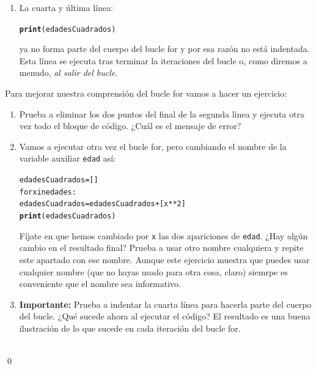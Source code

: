 \documentclass[10pt,a4paper]{article}\usepackage[]{graphicx}\usepackage[]{color}
\makeatletter
\newcommand{\hlstd}[1]{\textcolor[rgb]{0.345,0.345,0.345}{#1}}%
\newcommand{\hlkwd}[1]{\textcolor[rgb]{0.737,0.353,0.396}{\textbf{#1}}}%
\newenvironment{kframe}{%
 \def\at@end@of@kframe{}%
 \ifinner\ifhmode%
  \def\at@end@of@kframe{\end{minipage}}%
  \begin{minipage}{\columnwidth}%
 \fi\fi%
 \def\FrameCommand##1{\hskip\@totalleftmargin \hskip-\fboxsep
 \colorbox{shadecolor}{##1}\hskip-\fboxsep
     \hskip-\linewidth \hskip-\@totalleftmargin \hskip\columnwidth}%
 \MakeFramed {\advance\hsize-\width
   \@totalleftmargin\z@ \linewidth\hsize
   \@setminipage}}%
 {\par\unskip\endMakeFramed%
 \at@end@of@kframe}
\newenvironment{knitrout}{}{} %
\makeatother
\begin{document}
\begin{enumerate}
\item La cuarta y última línea:
\begin{knitrout}
\color{fgcolor}\begin{kframe}
\begin{alltt}
\hlkwd{print}\hlstd{(edadesCuadrados)}
\end{alltt}
\end{kframe}
\end{knitrout}
ya no forma parte del cuerpo del bucle for y por esa razón no está indentada. Esta línea se ejecuta tras terminar la iteraciones del bucle o, como diremos a menudo, {\em al salir del bucle}.

\end{enumerate}

Para mejorar nuestra comprensión del bucle for vamos a hacer un ejercicio:

\begin{ejercicio}
\label{tut02:ejercicio15}
\quad
\begin{enumerate}
\item Prueba a eliminar los dos puntos del final de la segunda línea y ejecuta otra vez todo el bloque de código. ¿Cuál es el mensaje de error?

\item Vamos a ejecutar otra vez el bucle for, pero cambiando el nombre de la variable auxiliar {\tt edad} así:
\begin{knitrout}
\color{fgcolor}\begin{kframe}
\begin{alltt}
edadesCuadrados = []
for x in edades:
  edadesCuadrados = edadesCuadrados + [x**2]
\hlkwd{print}(edadesCuadrados)
\end{alltt}
\end{kframe}
\end{knitrout}
Fíjate en que hemos cambiado por {\tt x} las dos apariciones de {\tt edad}. ¿Hay algún cambio en el resultado final? Prueba a usar otro nombre cualquiera y repite este apartado con ese nombre. Aunque este ejercicio muestra que puedes usar cualquier nombre (que no hayas usado para otra cosa, claro) siemrpe es conveniente que el nombre sea informativo.

\item {\bf Importante:} Prueba a indentar la cuarta línea para hacerla parte del cuerpo del bucle. ¿Qué sucede ahora al ejecutar el código? El resultado es una buena ilustración de lo que sucede en cada iteración del bucle for.
\end{enumerate}
\quad\\
\qed
\end{ejercicio}
\end{document}
